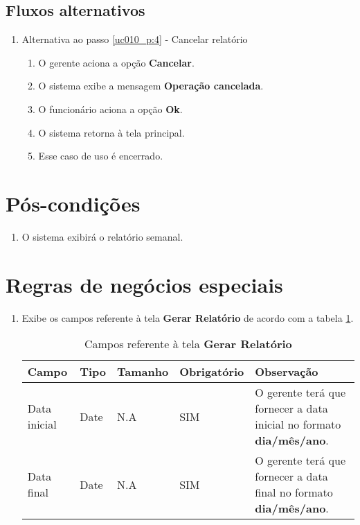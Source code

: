 \subsection{Fluxos alternativos}

\begin{enumerate}[label=A\arabic*]	
	\item Alternativa ao passo \ref{uc010_p:4} - Cancelar relatório \label{uc010_a:1}
	\begin{enumerate}[label*=.\arabic*]
		\item O gerente aciona a opção \textbf{Cancelar}.
		\item O sistema exibe a mensagem \textbf{Operação cancelada}.
		\item O funcionário aciona a opção \textbf{Ok}.
		\item O sistema retorna à tela principal.
		\item Esse caso de uso é encerrado.
	\end{enumerate}			 	
\end{enumerate}

\section{Pós-condições}

\begin{enumerate}
	\item O sistema exibirá o relatório semanal.	
\end{enumerate}

\section{Regras de negócios especiais}

\begin{enumerate}[label=RN\arabic*]
	\item Exibe os campos referente à tela \textbf{Gerar Relatório} de acordo com a tabela \ref{uc010_tb_rn1}. \label{uc010_rn:1}
	\begin{table}[htb]
		\ABNTEXfontereduzida
		\caption[Campos referente à tela \textbf{Gerar Relatório}]{Campos referente à tela \textbf{Gerar Relatório}}
		\label{uc010_tb_rn1}
		\begin{tabular}{|p{3.0cm}|p{2.0cm}|p{1.5cm}|p{2.0cm}|p{5.75cm}|}
			\hline
			\textbf{Campo} & \textbf{Tipo} & \textbf{Tamanho} & \textbf{Obrigatório} & \textbf{Observação}                                                         \\ \hline
			Data inicial   & Date          & N.A              & SIM                  & O gerente terá que fornecer a data inicial no formato \textbf{dia/mês/ano}. \\ \hline
			Data final     & Date          & N.A              & SIM                  & O gerente terá que fornecer a data final no formato \textbf{dia/mês/ano}.   \\ \hline
		\end{tabular}
	\end{table}
\end{enumerate}